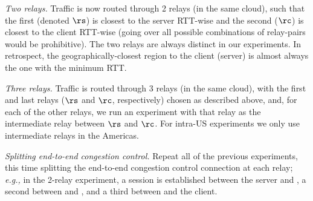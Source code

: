 \documentclass[sigconf,usenames,dvipsnames,geometry]{acmart}
\newcommand{\mycomm}[3]{{\color{#2} \textbf{[#1: #3]}}}
\newcommand{\mycomm}[3]{}
\newcommand{\IK}[1]{\mycomm{IK}{blue}{#1}}
\newcommand{\AB}[1]{\mycomm{AB}{Orange}{#1}}
\newcommand{\NR}[1]{\mycomm{NR}{OliveGreen}{#1}}
\providecommand{\eg}{\emph{e.g.,} }
\newcommand{\PST}[1]{\smallskip\noindent\textit{#1}} %
\begin{document}

\PST{Two relays.} Traffic is now routed through 2 relays (in the same cloud), such that the first (denoted $\rs$) is closest to the server RTT-wise and the second ($\rc$) is closest to the client RTT-wise (going over all possible combinations of relay-pairs would be prohibitive). The two relays are always distinct in our experiments. %
In retrospect, the geographically-closest region to the client (server) is almost always the one with the minimum RTT.


\PST{Three relays.} Traffic is routed through 3 relays (in the same cloud), with the first and last relays ($\rs$ and $\rc$, respectively) chosen as described above, and, for each of the other relays, we run an experiment with that relay as the intermediate relay between $\rs$ and $\rc$. For intra-US experiments we only use intermediate relays in the Americas.

\PST{Splitting end-to-end congestion control.} Repeat all of the previous experiments, this time splitting the end-to-end congestion control connection at each relay; \eg in the 2-relay experiment, a session is established between the server and \rs, a second between \rs and \rc, and a third between \rc and the client.
\end{document}
